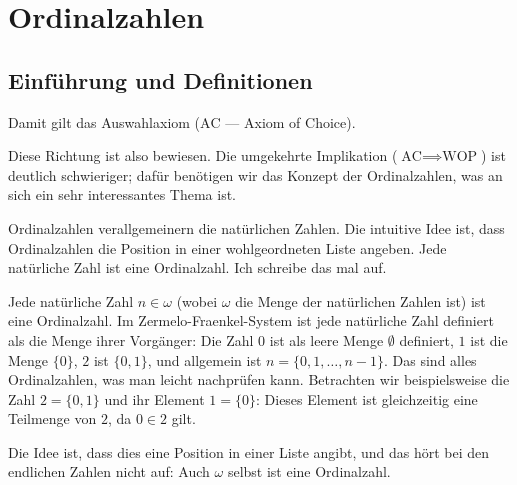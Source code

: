 \section{Ordinalzahlen}
\subsection{Einführung und Definitionen}

\begin{spoken-clean}[00:39:33 - 00:41:28]
Damit gilt das Auswahlaxiom ($\text{AC}$ --- Axiom of Choice).

Diese Richtung ist also bewiesen. Die umgekehrte Implikation ($\text{AC} \implies \text{WOP}$) ist deutlich schwieriger; dafür benötigen wir das Konzept der Ordinalzahlen, was an sich ein sehr interessantes Thema ist.

Ordinalzahlen verallgemeinern die natürlichen Zahlen. Die intuitive Idee ist, dass Ordinalzahlen die Position in einer wohlgeordneten Liste angeben. Jede natürliche Zahl ist eine Ordinalzahl. Ich schreibe das mal auf.

Jede natürliche Zahl $n \in \omega$ (wobei $\omega$ die Menge der natürlichen Zahlen ist) ist eine Ordinalzahl. Im Zermelo-Fraenkel-System ist jede natürliche Zahl definiert als die Menge ihrer Vorgänger: Die Zahl $0$ ist als leere Menge $\emptyset$ definiert, $1$ ist die Menge $\{0\}$, $2$ ist $\{0, 1\}$, und allgemein ist $n = \{0, 1, \dots, n-1\}$. Das sind alles Ordinalzahlen, was man leicht nachprüfen kann. Betrachten wir beispielsweise die Zahl $2 = \{0, 1\}$ und ihr Element $1 = \{0\}$: Dieses Element ist gleichzeitig eine Teilmenge von $2$, da $0 \in 2$ gilt.

Die Idee ist, dass dies eine Position in einer Liste angibt, und das hört bei den endlichen Zahlen nicht auf: Auch $\omega$ selbst ist eine Ordinalzahl.
\end{spoken-clean}

\begin{math-stroke}
\end{math-stroke}

